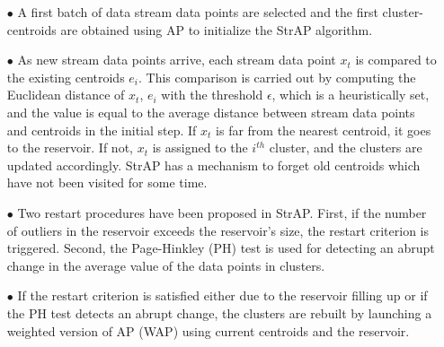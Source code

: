  






\begin{itemize}
    \item[$\bullet$] A first batch of data stream data points are selected and the first cluster-centroids are obtained using AP to initialize the StrAP algorithm.
    
    \item[$\bullet$] As new stream data points arrive,  each stream data point $x_t$ is compared to the existing centroids $e_i$. This comparison is carried out by computing the Euclidean distance of $x_t$, $e_i$ with the threshold $\epsilon$, which is a heuristically set, and the value is equal to the average distance between stream data points and centroids in the initial step. If $x_t$ is far from the nearest centroid, it goes to the reservoir. If not, $x_t$ is assigned to the $i^{th}$ cluster, and the clusters are updated accordingly. StrAP has a mechanism to forget old centroids which have not been visited for some time.
    
    \item[$\bullet$]  Two restart procedures have been proposed in StrAP. First, if the number of outliers in the reservoir exceeds the reservoir's size, the restart criterion is triggered. Second, the Page-Hinkley (PH) test is used for detecting an abrupt change in the average value of the data points in clusters. 
    
    \item[$\bullet$] If the restart criterion is satisfied either due to the reservoir filling up or if the PH test detects an abrupt change, the clusters are rebuilt by launching a weighted version of AP (WAP) using current centroids and the reservoir.
\end{itemize}

